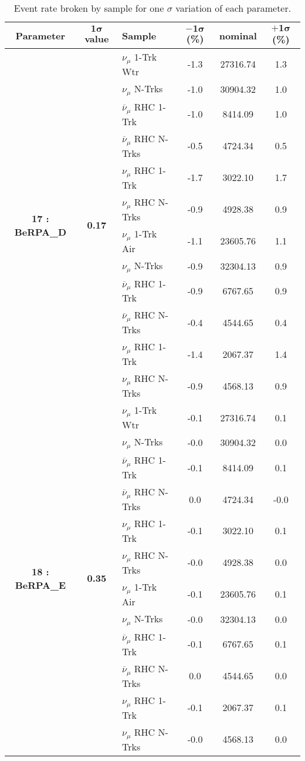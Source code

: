 \addtocounter{table}{-1}
\begin{table}[ht!]
\centering
\begin{tabular}{ c  c  l  c  c  c }
\midrule[1.3pt]
\textbf{Parameter} & \textbf{$\mathbf{1\sigma}$ value} & \textbf{Sample} & \textbf{$\mathbf{-1\sigma}$ (\%)}  &  \textbf{nominal}  &  \textbf{$\mathbf{+1\sigma}$ (\%)} \\
\midrule[1.3pt]
\multirow{12}{*}{\textbf{17 : BeRPA\_D}} & \multirow{12}{*}{\textbf{0.17}} & $\nu_\mu$ 1-Trk Wtr &   -1.3 &  27316.74 &   1.3 \\ 
 &  & $\nu_\mu$ N-Trks &   -1.0 &  30904.32 &   1.0 \\ 
 &  & $\overline{\nu}_\mu$ RHC 1-Trk &   -1.0 &  8414.09 &   1.0 \\ 
 &  & $\overline{\nu}_\mu$ RHC N-Trks &   -0.5 &  4724.34 &   0.5 \\ 
 &  & $\nu_\mu$ RHC 1-Trk &   -1.7 &  3022.10 &   1.7 \\ 
 &  & $\nu_\mu$ RHC N-Trks &   -0.9 &  4928.38 &   0.9 \\ 
 &  & $\nu_\mu$ 1-Trk Air &   -1.1 &  23605.76 &   1.1 \\ 
 &  & $\nu_\mu$ N-Trks &   -0.9 &  32304.13 &   0.9 \\ 
 &  & $\overline{\nu}_\mu$ RHC 1-Trk &   -0.9 &  6767.65 &   0.9 \\ 
 &  & $\overline{\nu}_\mu$ RHC N-Trks &   -0.4 &  4544.65 &   0.4 \\ 
 &  & $\nu_\mu$ RHC 1-Trk &   -1.4 &  2067.37 &   1.4 \\ 
 &  & $\nu_\mu$ RHC N-Trks &   -0.9 &  4568.13 &   0.9 \\ 
\midrule[1.3pt]
\multirow{12}{*}{\textbf{18 : BeRPA\_E}} & \multirow{12}{*}{\textbf{0.35}} & $\nu_\mu$ 1-Trk Wtr &   -0.1 &  27316.74 &   0.1 \\ 
 &  & $\nu_\mu$ N-Trks &   -0.0 &  30904.32 &   0.0 \\ 
 &  & $\overline{\nu}_\mu$ RHC 1-Trk &   -0.1 &  8414.09 &   0.1 \\ 
 &  & $\overline{\nu}_\mu$ RHC N-Trks &   0.0 &  4724.34 &   -0.0 \\ 
 &  & $\nu_\mu$ RHC 1-Trk &   -0.1 &  3022.10 &   0.1 \\ 
 &  & $\nu_\mu$ RHC N-Trks &   -0.0 &  4928.38 &   0.0 \\ 
 &  & $\nu_\mu$ 1-Trk Air &   -0.1 &  23605.76 &   0.1 \\ 
 &  & $\nu_\mu$ N-Trks &   -0.0 &  32304.13 &   0.0 \\ 
 &  & $\overline{\nu}_\mu$ RHC 1-Trk &   -0.1 &  6767.65 &   0.1 \\ 
 &  & $\overline{\nu}_\mu$ RHC N-Trks &   0.0 &  4544.65 &   0.0 \\ 
 &  & $\nu_\mu$ RHC 1-Trk &   -0.1 &  2067.37 &   0.1 \\ 
 &  & $\nu_\mu$ RHC N-Trks &   -0.0 &  4568.13 &   0.0 \\ 
\midrule[1.3pt]
\end{tabular}
\centering
\caption{Event rate broken by sample for one $\sigma$ variation of each parameter.}
\end{table}
